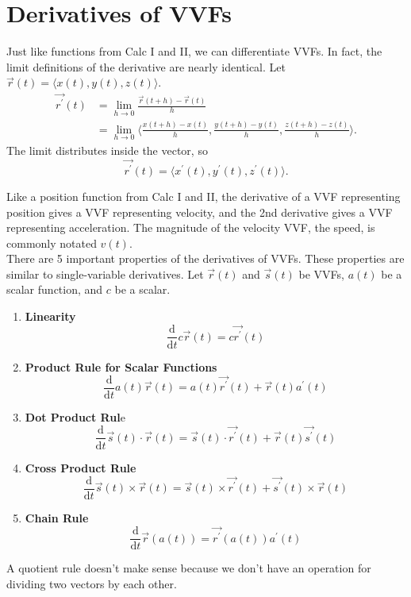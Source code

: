 \section{Derivatives of VVFs}
\noindent
Just like functions from Calc I and II, we can differentiate VVFs.
In fact, the limit definitions of the derivative are nearly identical.
Let $\vec{r}(t) = \langle x(t), y(t), z(t) \rangle$.
\begin{align*}
	\vec{r^\prime}(t) &= \lim_{h\to 0}{\frac{\vec{r}(t+h)-\vec{r}(t)}{h}} \\
	&= \lim_{h\to 0}{\bigg\langle \frac{x(t+h)-x(t)}{h}, \frac{y(t+h)-y(t)}{h}, \frac{z(t+h)-z(t)}{h} \bigg\rangle}.
\end{align*}
The limit distributes inside the vector, so
\begin{equation*}
	\vec{r^\prime}(t) = \langle x^{\prime}(t), y^{\prime}(t), z^{\prime}(t) \rangle.
\end{equation*}

\noindent
Like a position function from Calc I and II, the derivative of a VVF representing position gives a VVF representing velocity, and the 2nd derivative gives a VVF representing acceleration.
The magnitude of the velocity VVF, the speed, is commonly notated $v(t)$.\\

\noindent
There are 5 important properties of the derivatives of VVFs.
These properties are similar to single-variable derivatives.
Let $\vec{r}(t)$ and $\vec{s}(t)$ be VVFs, $a(t)$ be a scalar function, and $c$ be a scalar.
\begin{enumerate}[label=]
	\item \textbf{Linearity}
	\begin{equation*}
		\frac{\mathrm{d}}{\mathrm{d}t}c\vec{r}(t) = c\vec{r^\prime}(t)
	\end{equation*}
	\item \textbf{Product Rule for Scalar Functions}
	\begin{equation*}
		\frac{\mathrm{d}}{\mathrm{d}t}a(t)\vec{r}(t) = a(t)\vec{r^\prime}(t) + \vec{r}(t)a^{\prime}(t)
	\end{equation*}
	\item \textbf{Dot Product Rul}e
	\begin{equation*}
		\frac{\mathrm{d}}{\mathrm{d}t}\vec{s}(t)\cdot\vec{r}(t) = \vec{s}(t)\cdot\vec{r^\prime}(t) + \vec{r}(t)\vec{s^\prime}(t)
	\end{equation*}
	\item \textbf{Cross Product Rule}
	\begin{equation*}
		\frac{\mathrm{d}}{\mathrm{d}t}\vec{s}(t)\times\vec{r}(t) = \vec{s}(t)\times\vec{r^\prime}(t) + \vec{s^\prime}(t)\times\vec{r}(t)
	\end{equation*}
	\item \textbf{Chain Rule}
	\begin{equation*}
		\frac{\mathrm{d}}{\mathrm{d}t}\vec{r}(a(t)) = \vec{r^\prime}(a(t))a^{\prime}(t)
	\end{equation*}
\end{enumerate}
A quotient rule doesn't make sense because we don't have an operation for dividing two vectors by each other.\\

